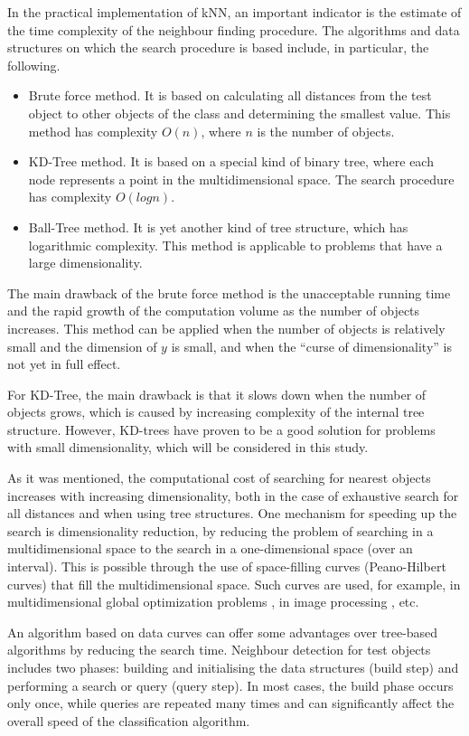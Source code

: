 \documentclass[sensors,article,submit,moreauthors,pdftex]{Definitions/mdpi}
\begin{document}
In the practical implementation of kNN, an important indicator is the estimate of the time complexity of the neighbour finding procedure. The algorithms and data structures on which the search procedure is based include, in particular, the following.


\begin{itemize}
\item Brute force method. It is based on calculating all distances from the test object to other objects of the class and determining the smallest value. This method has complexity $O(n)$, where $n$ is the number of objects.
\item KD-Tree method. It is based on a special kind of binary tree, where each node represents a point in the multidimensional space. The search procedure has complexity $O(log n)$.
\item Ball-Tree method. It is yet another kind of tree structure, which has logarithmic complexity. This method is applicable to problems that have a large dimensionality.
\end{itemize}

The main drawback of the brute force method is the unacceptable running time and the rapid growth of the computation volume as the number of objects increases. This method can be applied when the number of objects is relatively small and the dimension of $y$ is small, and when the ``curse of dimensionality'' is not yet in full effect.

For KD-Tree, the main drawback is that it slows down when the number of objects grows, which is caused by increasing complexity of the internal tree structure. However, KD-trees have proven to be a good solution for problems with small dimensionality, which will be considered in this study.

As it was mentioned, the computational cost of searching for nearest objects increases with increasing dimensionality, both in the case of exhaustive search for all distances and when using tree structures. One mechanism for speeding up the search is dimensionality reduction, by reducing the problem of searching in a multidimensional space to the search in a one-dimensional space (over an interval). This is possible through the use of space-filling curves (Peano-Hilbert curves) that fill the multidimensional space. Such curves are used, for example, in multidimensional global optimization problems \cite{Strongin2018,Gergel2021}, in image processing \cite{Liang2008,Costa2012,Herrero2015}, etc.

An algorithm based on data curves can offer some advantages over tree-based algorithms by reducing the search time. Neighbour detection for test objects includes two phases: building and initialising the data structures (build step) and performing a search or query (query step). In most cases, the build phase occurs only once, while queries are repeated many times and can significantly affect the overall speed of the classification algorithm. 
\end{document}
